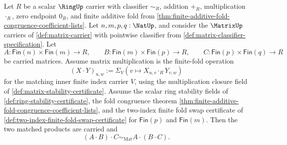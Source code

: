 \begin{theorem}
\label{thm:matrix-multiplication-associativity-finite-folds}
Let $R$ be a scalar $\RingUp$ carrier with classifier $\sim_R$, addition $+_R$, multiplication $\cdot_R$, zero endpoint $0_R$, and finite additive fold from \autoref{thm:finite-additive-fold-congruence-coefficient-lists}. Let $n,m,p,q:\NatUp$, and consider the $\MatrixUp$ carriers of \autoref{def:matrix-carrier} with pointwise classifier from \autoref{def:matrix-classifier-specification}. Let
$$
A:\mathsf{Fin}(n)\times\mathsf{Fin}(m)\to R,
\qquad
B:\mathsf{Fin}(m)\times\mathsf{Fin}(p)\to R,
\qquad
C:\mathsf{Fin}(p)\times\mathsf{Fin}(q)\to R
$$
be carried matrices. Assume matrix multiplication is the finite-fold operation
$$
(X\cdot Y)_{u,w}:=\Sigma_V(v\mapsto X_{u,v}\cdot_RY_{v,w})
$$
for the matching inner finite index carrier $V$, using the multiplication closure field of \autoref{def:matrix-stability-certificate}. Assume the scalar ring stability fields of \autoref{def:ring-stability-certificate}, the fold congruence theorem \autoref{thm:finite-additive-fold-congruence-coefficient-lists}, and the two-index finite fold swap certificate of \autoref{def:two-index-finite-fold-swap-certificate} for $\mathsf{Fin}(p)$ and $\mathsf{Fin}(m)$. Then the two matched products are carried and
$$
(A\cdot B)\cdot C\sim_{\mathrm{Mat}}A\cdot(B\cdot C).
$$
\end{theorem}
